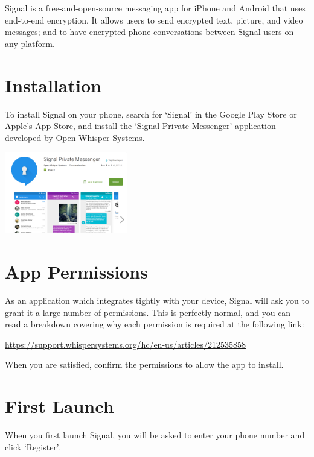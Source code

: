 \documentclass[10.5pt,a4paper]{article} %
\begin{document}
\begin{multicols*}{2} %

Signal is a free-and-open-source messaging app for iPhone and Android that uses end-to-end encryption. It allows users to send encrypted text, picture, and video messages; and to have encrypted phone conversations between Signal users on any platform.

\section*{Installation}
To install Signal on your phone, search for `Signal' in the Google Play Store or Apple's App Store, and install the `Signal Private Messenger' application developed by Open Whisper Systems.

\begin{center}
	\includegraphics[width=0.40\textwidth]{playstore.png} %
\end{center}

\section*{App Permissions}
As an application which integrates tightly with your device, Signal will ask you to grant it a large number of permissions. This is perfectly normal, and you can read a breakdown covering why each permission is required at the following link:

\begin{center}
	\url{https://support.whispersystems.org/hc/en-us/articles/212535858} %
\end{center}

When you are satisfied, confirm the permissions to allow the app to install.


\section*{First Launch}
When you first launch Signal, you will be asked to enter your phone number and click `Register'.


\end{multicols*}
\end{document}
